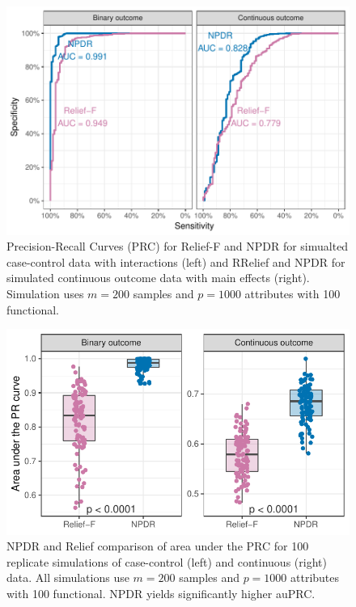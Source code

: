 \documentclass{article}
\begin{document}
\begin{figure}[h]%
\centerline{\includegraphics[]{../figs/npdr_relief_auroc.pdf}}
\caption{Precision-Recall Curves (PRC) for Relief-F and NPDR for simualted case-control data with interactions (left) and RRelief and NPDR for simulated continuous outcome data with main effects (right). Simulation uses $m = 200$ samples and $p = 1000$ attributes with 100 functional. }
\label{fig:auROC}
\end{figure}

\begin{figure}[h]%
\centerline{\includegraphics[]{../figs/pr_compare_100.pdf}}
\caption{NPDR and Relief comparison of area under the PRC for 100 replicate simulations of case-control (left) and continuous (right) data. All simulations use $m = 200$ samples and $p = 1000$ attributes with 100 functional. NPDR yields significantly higher auPRC.}
\label{fig:auPRC}
\end{figure}
\end{document}
